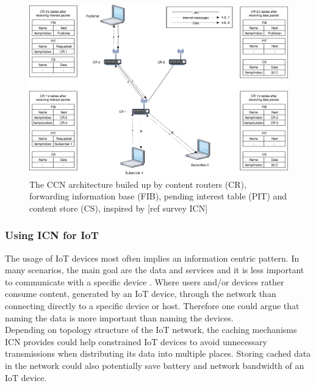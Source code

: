\begin{figure}
	\includegraphics[width=\textwidth]{figures/CCN-architecture.png}
	\caption{The CCN architecture builed up by content routers (CR), forwarding information base (FIB), pending interest table (PIT) and content store (CS), inspired by [ref survey ICN]}
	\label{fig:CCN-architecture}
\end{figure}



\subsubsection{Using ICN for IoT}
The usage of IoT devices most often implies an information centric pattern. In many scenarios, the main goal are the data and services and it is less important to communicate with a specific device \cite{Ahlgreniot}. Where users and/or devices rather consume content, generated by an IoT device, through the network than connecting directly to a specific device or host. Therefore one could argue that naming the data is more important than naming the devices.\\
Depending on topology structure of the IoT network, the caching mechanisms ICN provides could help constrained IoT devices to avoid unnecessary transmissions when distributing its data into multiple places. Storing cached data in the network could also potentially save battery and network bandwidth of an IoT device.

